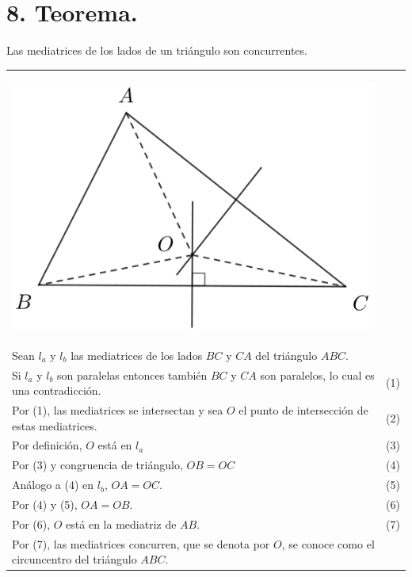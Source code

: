 \documentclass[12pt,a4paper, oneside]{book}
\begin{document}
\section{8. Teorema.}
Las mediatrices de los lados de un triángulo son concurrentes.\\
\begin{tabular}{p{15.9cm}p{1cm}}
\\
\begin{center}
\includegraphics[scale=0.6]{Imagenes/mediatriz.png} 
\end{center}
\\Sean $l_a$ y $l_b$ las mediatrices de los lados $BC$ y $CA$ del triángulo $ABC.$
\\Si $l_a$ y $l_b$ son paralelas entonces también $BC$ y $CA$ son paralelos, lo cual es una contradicción. &\medskip(1)
\\Por (1), las mediatrices se intersectan y sea $O$ el punto de intersección de estas mediatrices. & (2) 
\\Por definición, $O$ está en $l_a$ &(3)
\\Por (3) y congruencia de triángulo, $OB=OC$ &(4)
\\ Análogo a (4) en $l_b$, $OA=OC$. &(5)
\\Por (4) y (5), $OA=OB$. &(6)
\\Por (6), $O$ está en la mediatriz de $AB$. &(7)
\\ Por (7), las mediatrices concurren, que se denota por $O$, se conoce como el circuncentro del triángulo $ABC$. 
\end{tabular}
\end{document}
